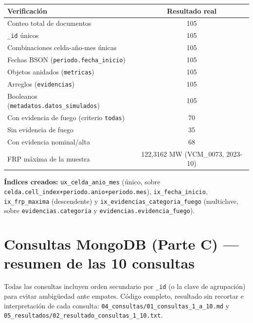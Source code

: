 \documentclass[11pt]{article}
\begin{document}
\begin{center}
\begin{tabular}{lc}
\toprule
\textbf{Verificación} & \textbf{Resultado real} \\
\midrule
Conteo total de documentos & 105 \\
\texttt{\_id} únicos & 105 \\
Combinaciones celda-año-mes únicas & 105 \\
Fechas BSON (\texttt{periodo.fecha\_inicio}) & 105 \\
Objetos anidados (\texttt{metricas}) & 105 \\
Arreglos (\texttt{evidencias}) & 105 \\
Booleanos (\texttt{metadatos.datos\_simulados}) & 105 \\
Con evidencia de fuego (criterio \texttt{todas}) & 70 \\
Sin evidencia de fuego & 35 \\
Con evidencia nominal/alta & 68 \\
FRP máxima de la muestra & 122,3162 MW (VCM\_0073, 2023-10) \\
\bottomrule
\end{tabular}
\end{center}

\textbf{Índices creados:} \texttt{ux\_celda\_anio\_mes} (único, sobre
\lstinline!celda.cell_index+periodo.anio+periodo.mes!), \texttt{ix\_fecha\_inicio},
\texttt{ix\_frp\_maxima} (descendente) y \texttt{ix\_evidencias\_categoria\_fuego}
(multiclave, sobre \lstinline!evidencias.categoria! y
\lstinline!evidencias.evidencia_fuego!).

\section{Consultas MongoDB (Parte C) --- resumen de las 10 consultas}

Todas las consultas incluyen orden secundario por \texttt{\_id} (o la clave
de agrupación) para evitar ambigüedad ante empates. Código completo,
resultado sin recortar e interpretación de cada consulta:
\texttt{04\_consultas/01\_consultas\_1\_a\_10.md} y
\texttt{05\_resultados/02\_resultado\_consultas\_1\_10.txt}.
\end{document}
